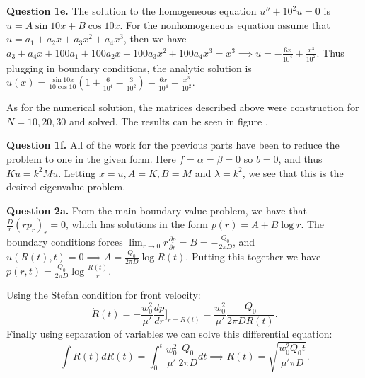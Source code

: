 \documentclass[letterpaper, reqno,11pt]{article}
\begin{document}
{\medskip\noindent\bf Question 1e.} The solution to the homogeneous equation $u''+10^2u=0$ is $u=A\sin 10x+B\cos 10x$. For the nonhomogeneous equation assume that $u=a_1+a_2x+a_3x^2+a_4x^{3}$, then we have $a_3+a_4x+100a_1+100a_2x+100a_3x^2+100a_4x^{3}=x^{3}\implies u=-\frac{6x}{10^{4}}+\frac{x^{3}}{10^2}$. Thus plugging in boundary conditions, the analytic solution is $u(x)=\frac{\sin 10x}{10\cos 10}\left(1+\frac{6}{10^{4}}-\frac{3}{10^2}\right)-\frac{6x}{10^{4}}+\frac{x^{3}}{10^2}$.

As for the numerical solution, the matrices described above were construction for $N=10,20,30$ and solved. The results can be seen in figure .

{\medskip\noindent\bf Question 1f.} All of the work for the previous parts have been to reduce the problem to one in the given form. Here $f=\alpha=\beta=0$ so $b=0$, and thus $Ku=k^2Mu$. Letting $x=u, A=K,B=M$ and $\lambda=k^2$, we see that this is the desired eigenvalue problem.

{\medskip\noindent\bf Question 2a.} From the main boundary value problem, we have that $\frac{D}{r}(rp_r)_r=0$, which has solutions in the form $p(r)=A+B\log r$. The boundary conditions forces $\lim_{r\to 0}r \frac{\partial p}{\partial r}=B=-\frac{Q_0}{2\pi D}$, and $u(R(t),t)=0\implies A=\frac{Q_0}{2\pi D}\log R(t)$. Putting this together we have $p(r,t)=\frac{Q_0}{2\pi D}\log \frac{R(t)}{r}$.

Using the Stefan condition for front velocity:
\[
\dot R(t)= -\frac{w_0^2}{\mu'}\frac{dp}{dr}\bigg]_{r=R(t)}=\frac{w_0^2}{\mu'}\frac{Q_0}{2\pi DR(t)}
.\]
Finally using separation of variables we can solve this differential equation:
\[
\int R(t)dR(t)=\int_0^{t}\frac{w_0^2}{\mu'}\frac{Q_0}{2\pi D}dt\implies R(t)=\sqrt{\frac{w_0^2Q_0t}{\mu'\pi D}}
.\]
\end{document}
